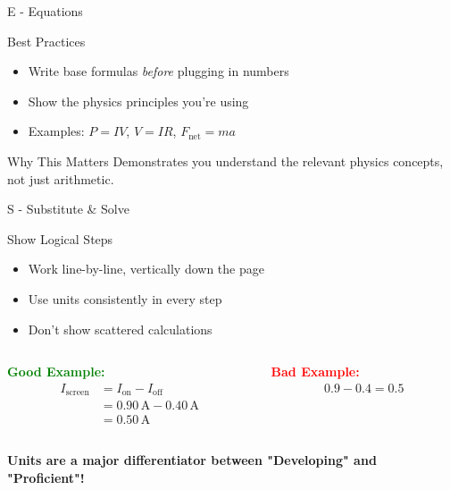 \documentclass{beamer}
\begin{document}
\begin{frame}{E - Equations}
\begin{block}{Best Practices}
\begin{itemize}
\item Write base formulas \emph{before} plugging in numbers
\item Show the physics principles you're using
\item Examples: $P = IV$, $V = IR$, $F_{\text{net}} = ma$
\end{itemize}
\end{block}

\begin{block}{Why This Matters}
Demonstrates you understand the relevant physics concepts, not just arithmetic.
\end{block}

\end{frame}

\begin{frame}{S - Substitute \& Solve}
\begin{block}{Show Logical Steps}
\begin{itemize}
\item Work line-by-line, vertically down the page
\item Use units consistently in every step
\item Don't show scattered calculations
\end{itemize}
\end{block}

\begin{columns}
\begin{column}{0.5\textwidth}
\textcolor{green}{\textbf{Good Example:}}
\begin{align}
I_{\text{screen}} &= I_{\text{on}} - I_{\text{off}} \\
&= 0.90\,\text{A} - 0.40\,\text{A} \\
&= 0.50\,\text{A}
\end{align}
\end{column}
\begin{column}{0.5\textwidth}
\textcolor{red}{\textbf{Bad Example:}}
\begin{align}
0.9 - 0.4 = 0.5
\end{align}
\end{column}
\end{columns}

\vspace{1cm}

\textbf{Units are a major differentiator between "Developing" and "Proficient"!}
\end{frame}
\end{document}
